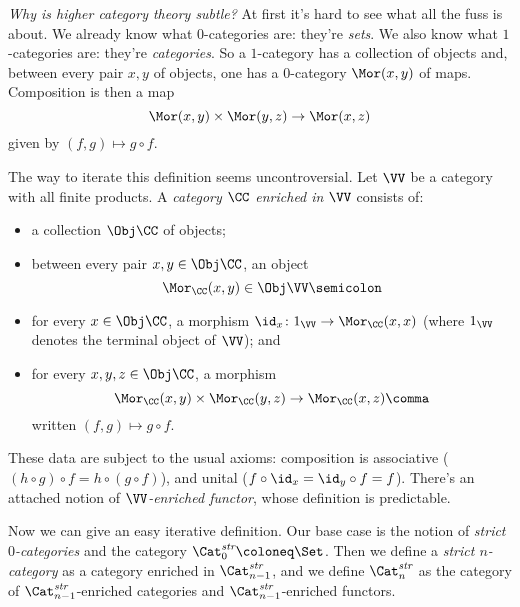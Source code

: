 

\minidiv

\noindent \emph{Why is higher category theory subtle?}
At first it's hard to see what all the fuss is about.
We already know what $0$-categories are: they're \emph{sets}.
We also know what $1$-categories are: they're \emph{categories}.
So a $1$-category has a collection of objects and, between every pair $x,y$ of objects, one has a $0$-category $\Mor(x,y)$ of maps.
Composition is then a map
\[
  \Mor(x,y) \times \Mor(y,z) \to \Mor(x,z)
\]
given by $(f,g) \mapsto g \circ f$.

The way to iterate this definition seems uncontroversial.
Let $\VV$ be a category with all finite products.
A \emph{category $\CC$ enriched in $\VV$} consists of:
\begin{itemize}
  \item a collection $\Obj \CC$ of objects;
  \item between every pair $x,y \in \Obj \CC$, an object
  \[
    \Mor_{\CC}(x,y) \in \Obj \VV \semicolon
  \]
  \item for every $x \in \Obj \CC$, a morphism $\id_x \colon 1_{\VV} \to \Mor_{\CC}(x,x)$ (where $1_{\VV}$ denotes the terminal object of $\VV$); and
  \item for every $x,y,z \in \Obj \CC$, a morphism
    \[
      \Mor_{\CC}(x,y) \times \Mor_{\CC}(y,z) \to \Mor_{\CC}(x,z) \comma
    \]
    written $(f,g) \mapsto g \circ f$.
\end{itemize}
These data are subject to the usual axioms: composition is associative ($(h \circ g) \circ f = h \circ (g \circ f)$), and unital ($f \circ \id_x = \id_y \circ f = f$).
There's an attached notion of \emph{$\VV$-enriched functor}, whose definition is predictable.

Now we can give an easy iterative definition.
Our base case is the notion of \emph{strict $0$-categories} and the category $\Cat^{\textit{str}}_0 \coloneq \Set$.
Then we define a \emph{strict $n$-category} as a category enriched in $\Cat^{\textit{str}}_{n-1}$,
and we define $\Cat^{\textit{str}}_n$ as the category of $\Cat^{\textit{str}}_{n-1}$-enriched categories and $\Cat^{\textit{str}}_{n-1}$-enriched functors.

